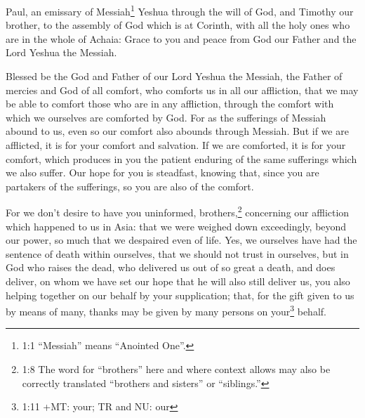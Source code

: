 \newpage
\null
\thispagestyle{empty}
\newpage
{}





\vspace{-1.36in}


\mychapter{} \myverse*{}Paul, an emissary of Messiah\footnote{1:1 “Messiah” means “Anointed One”.} Yeshua through the will of God, and Timothy our brother,
to the assembly of God which is at Corinth, with all the holy ones who are in the whole of Achaia:
\myverse{}Grace to you and peace from God our Father and the Lord Yeshua the Messiah.

\myverse{}Blessed be the God and Father of our Lord Yeshua the Messiah, the
Father of mercies and God of all comfort,
\myverse{}who comforts us in all our affliction, that we may be able to comfort those
who are in any affliction, through the comfort with which we ourselves are comforted by God.
\myverse{}For as the sufferings of Messiah abound to us, even so our comfort also abounds
through Messiah.
\myverse{}But if we are afflicted, it is for your comfort and salvation. If we are comforted,
it is for your comfort, which produces in you the patient enduring of the same sufferings which we also
suffer.
\myverse{}Our hope for you is steadfast, knowing that, since you are partakers of the
sufferings, so you are also of the comfort.

\myverse{}For we don’t desire to have you uninformed, brothers,\footnote{1:8 The word for “brothers” here and where context allows may also be correctly translated “brothers
	and sisters” or “siblings.”} concerning our affliction which happened to us in Asia: that we were
weighed down exceedingly, beyond our power, so much that we despaired even of life.
\myverse{}Yes, we ourselves have had the sentence of death within ourselves, that we should
not trust in ourselves, but in God who raises the dead,
\myverse{}who delivered us out of so great a death, and does deliver, on whom we have
set our hope that he will also still deliver us,
\myverse{}you also helping together on our behalf by your supplication; that, for the
gift given to us by means of many, thanks may be given by many persons on your\footnote{1:11 +MT: your; TR and NU: our} behalf.


